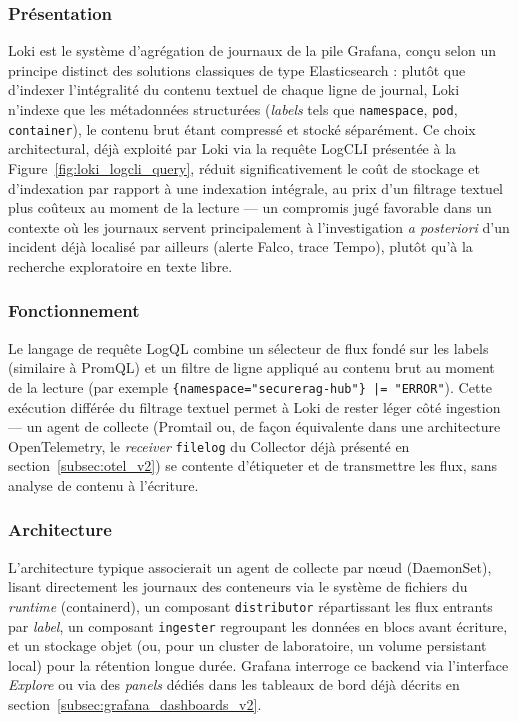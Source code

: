 \subsubsection{Présentation}
Loki est le système d'agrégation de journaux de la pile Grafana, conçu selon un principe distinct des solutions classiques de type Elasticsearch : plutôt que d'indexer l'intégralité du contenu textuel de chaque ligne de journal, Loki n'indexe que les métadonnées structurées (\textit{labels} tels que \texttt{namespace}, \texttt{pod}, \texttt{container}), le contenu brut étant compressé et stocké séparément. Ce choix architectural, déjà exploité par Loki via la requête LogCLI présentée à la Figure~\ref{fig:loki_logcli_query}, réduit significativement le coût de stockage et d'indexation par rapport à une indexation intégrale, au prix d'un filtrage textuel plus coûteux au moment de la lecture — un compromis jugé favorable dans un contexte où les journaux servent principalement à l'investigation \textit{a posteriori} d'un incident déjà localisé par ailleurs (alerte Falco, trace Tempo), plutôt qu'à la recherche exploratoire en texte libre.

\subsubsection{Fonctionnement}
Le langage de requête LogQL combine un sélecteur de flux fondé sur les labels (similaire à PromQL) et un filtre de ligne appliqué au contenu brut au moment de la lecture (par exemple \texttt{\{namespace="securerag-hub"\} |= "ERROR"}). Cette exécution différée du filtrage textuel permet à Loki de rester léger côté ingestion — un agent de collecte (Promtail ou, de façon équivalente dans une architecture OpenTelemetry, le \textit{receiver} \texttt{filelog} du Collector déjà présenté en section~\ref{subsec:otel_v2}) se contente d'étiqueter et de transmettre les flux, sans analyse de contenu à l'écriture.

\subsubsection{Architecture}
L'architecture typique associerait un agent de collecte par nœud (DaemonSet), lisant directement les journaux des conteneurs via le système de fichiers du \textit{runtime} (containerd), un composant \texttt{distributor} répartissant les flux entrants par \textit{label}, un composant \texttt{ingester} regroupant les données en blocs avant écriture, et un stockage objet (ou, pour un cluster de laboratoire, un volume persistant local) pour la rétention longue durée. Grafana interroge ce backend via l'interface \textit{Explore} ou via des \textit{panels} dédiés dans les tableaux de bord déjà décrits en section~\ref{subsec:grafana_dashboards_v2}.

